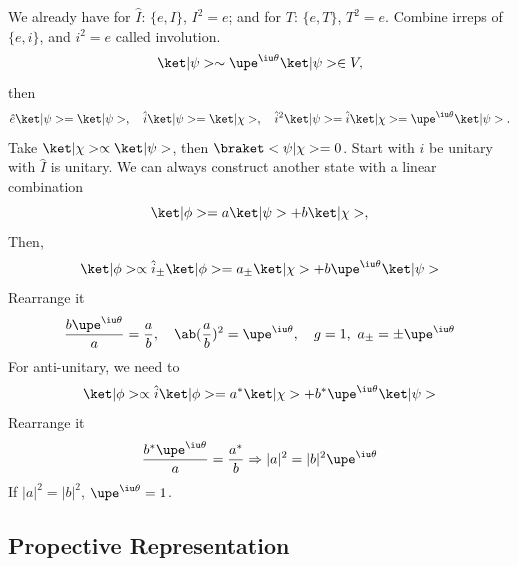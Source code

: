 We already have
for $\hat I$: $\{e, I\}$, $I^2 = e$;
and for $T$: $\{e,T\}$, $T^2 = e$.
Combine irreps of $\{e,i\}$, and $i^2 = e$ called involution.
\[
  \ket|\psi> \sim \upe^{\iu\theta}\ket|\psi> \in V,
\]
then
\[
  \hat e\ket|\psi> = \ket|\psi>, \quad
  \hat i\ket|\psi> = \ket|\chi>, \quad
  \hat i^2 \ket|\psi> = \hat i \ket|\chi> = \upe^{\iu\theta} \ket|\psi>.
\]
Take $\ket|\chi> \propto \ket|\psi>$, then $\braket<\psi|\chi> = 0$.
Start with $\hat i$ be unitary with $\hat I$ is unitary.
We can always construct another state with a linear combination
\[
  \ket|\phi> = a\ket|\psi> + b\ket|\chi>,
\]
Then,
\[
  \ket|\phi> \propto \hat i_\pm\ket|\phi>
= a_\pm\ket|\chi> + b\upe^{\iu\theta}\ket|\psi>
\]
Rearrange it
\[
  \frac{b\upe^{\iu\theta}}{a} = \frac ab, \quad
  \ab(\frac ab)^2 = \upe^{\iu\theta}, \quad
  g = 1,\ a_\pm = \pm \upe^{\iu\theta}
\]
For anti-unitary, we need to
\[
  \ket|\phi> \propto \hat i\ket|\phi>
= a^*\ket|\chi> + b^*\upe^{\iu\theta}\ket|\psi>
\]
Rearrange it
\[
  \frac{b^* \upe^{\iu\theta}}{a} = \frac{a^*}{b} \Rightarrow
  |a|^2 = |b|^2\upe^{\iu\theta}
\]
If $|a|^2 = |b|^2$, $\upe^{\iu\theta} = 1$.

\subsection{Propective Representation}

